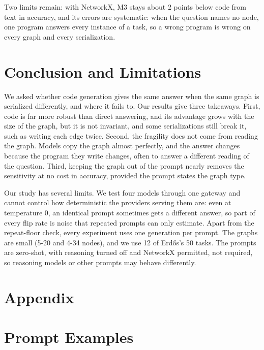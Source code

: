 \documentclass[11pt]{article}
\begin{document}
Two limits remain: with NetworkX, M3 stays about 2 points below code from text in accuracy, and its errors are systematic: when the question names no node, one program answers every instance of a task, so a wrong program is wrong on every graph and every serialization.

\section{Conclusion and Limitations}

We asked whether code generation gives the same answer when the same graph is serialized differently, and where it fails to. Our results give three takeaways. First, code is far more robust than direct answering, and its advantage grows with the size of the graph, but it is not invariant, and some serializations still break it, such as writing each edge twice. Second, the fragility does not come from reading the graph. Models copy the graph almost perfectly, and the answer changes because the program they write changes, often to answer a different reading of the question. Third, keeping the graph out of the prompt nearly removes the sensitivity at no cost in accuracy, provided the prompt states the graph type.

Our study has several limits. We test four models through one gateway and cannot control how deterministic the providers serving them are: even at temperature 0, an identical prompt sometimes gets a different answer, so part of every flip rate is noise that repeated prompts can only estimate. Apart from the repeat-floor check, every experiment uses one generation per prompt. The graphs are small (5-20 and 4-34 nodes), and we use 12 of Erdős's 50 tasks. The prompts are zero-shot, with reasoning turned off and NetworkX permitted, not required, so reasoning models or other prompts may behave differently.



\onecolumn
\appendix
\section*{Appendix}
\renewcommand{\thefigure}{\thesection\arabic{figure}}
\renewcommand{\thetable}{\thesection\arabic{table}}

\FloatBarrier
\section{Prompt Examples}\label{app:prompts}
\end{document}
